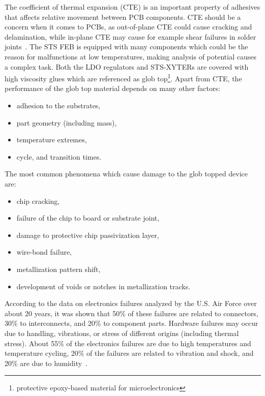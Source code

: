 The coefficient of thermal expansion (\gls{CTE}) is an important property of adhesives that affects relative movement between \gls{PCB} components. \gls{CTE} should be a concern when it comes to \glspl{PCB}, as out-of-plane \gls{CTE} could cause cracking and delamination, while in-plane \gls{CTE} may cause for example shear failures in solder joints~\cite{cte_report}. The \gls{STS} \gls{FEB} is equipped with many components which could be the reason for malfunctions at low temperatures, making analysis of potential causes a complex task. Both the LDO regulators and STS-XYTERs are covered with high viscosity glues which are referenced as glob top\footnote{protective epoxy-based material for microelectronics}. Apart from \gls{CTE}, the performance of the glob top material depends on many other factors:
\begin{itemize}
    \item adhesion to the substrates,
    \item part geometry (including mass),
    \item temperature extremes,
    \item cycle, and transition times.
\end{itemize}


The most common phenomena which cause damage to the glob topped device are:
\begin{itemize}
    \item chip cracking,
    \item failure of the chip to board or substrate joint,
    \item damage to protective chip passivization layer,
    \item wire-bond failure,
    \item metallization pattern shift,
    \item development of voids or notches in metallization tracks. 
\end{itemize}


According to the data on electronics failures analyzed by the U.S. Air Force over about 20 years, it was shown that 50\% of these failures are related to connectors, 30\% to interconnects, and 20\% to component
parts. Hardware failures may occur due to handling, vibrations, or stress of different origins (including thermal stress). About 55\% of the electronics failures are due to high temperatures and temperature cycling, 20\% of the failures are related to vibration and shock, and 20\% are due to humidity~\cite{thermal_electronics}. 

